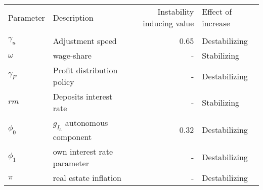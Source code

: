 \begin{table}
\centering
\label{tab:sensibility}
\begin{tabular}{llrl}
\toprule
Parameter &                     Description &  Instability inducing value & Effect of increase \\
           &                                 &                             &                    \\
\midrule
$\gamma_u$ &                Adjustment speed &                        0.65 &      Destabilizing \\
$\omega$   &                      wage-share &                           - &        Stabilizing \\
$\gamma_F$ &      Profit distribution policy &                           - &      Destabilizing \\
$rm$       &          Deposits interest rate &                           - &        Stabilizing \\
$\phi_0$   &  $g_{I_h}$ autonomous component &                        0.32 &      Destabilizing \\
$\phi_1$   &     own interest rate parameter &                           - &      Destabilizing \\
$\pi$      &           real estate inflation &                           - &      Destabilizing \\
\bottomrule
\end{tabular}
\end{table}
